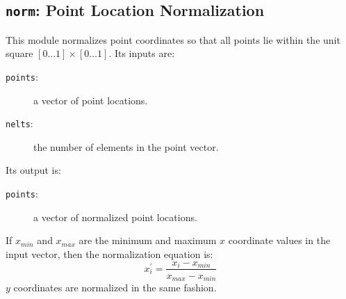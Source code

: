 \subsection{{\tt{norm}}:
	Point Location Normalization
	\label{s:toys-norm}}

This module normalizes point coordinates so that all points lie within the unit square $[0{\ldots}1]{\times}[0{\ldots}1]$.
Its inputs are:
\begin{description}
\item[{\tt{points}}:]
	a vector of point locations.
\item[{\tt{nelts}}:]
	the number of elements in the point vector.
\end{description}
Its output is:
\begin{description}
\item[{\tt{points}}:]
	a vector of normalized point locations.
\end{description}
If $x_{min}$ and $x_{max}$ are the minimum and maximum $x$ coordinate values in the input vector,
then the normalization equation is:
\[	x_{i}^{\prime} = \frac{x_i - x_{min}}{x_{max} - x_{min}}	\]
$y$ coordinates are normalized in the same fashion.
